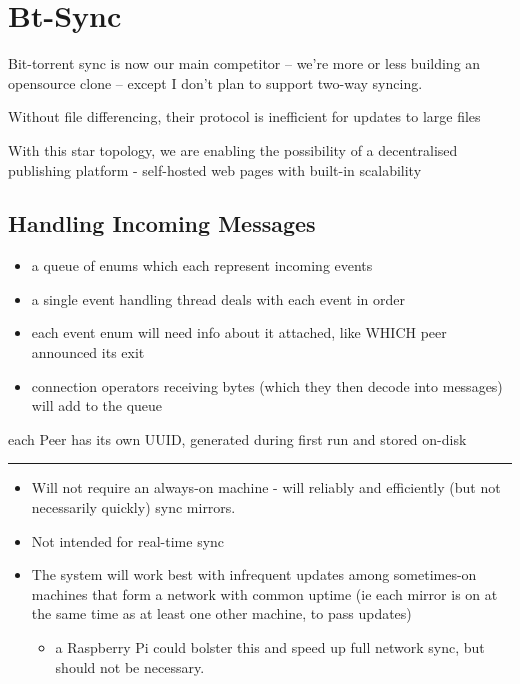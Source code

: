 \documentclass[12pt,a4paper,]{book}
\begin{document}
\section{Bt-Sync}\label{bt-sync}

Bit-torrent sync is now our main competitor -- we're more or less
building an opensource clone -- except I don't plan to support two-way
syncing.

Without file differencing, their protocol is inefficient for updates to
large files

With this star topology, we are enabling the possibility of a
decentralised publishing platform - self-hosted web pages with built-in
scalability

\subsection{Handling Incoming
Messages}\label{handling-incoming-messages}

\begin{itemize}
\itemsep1pt\parskip0pt
\item
  a queue of enums which each represent incoming events
\item
  a single event handling thread deals with each event in order
\item
  each event enum will need info about it attached, like WHICH peer
  announced its exit
\item
  connection operators receiving bytes (which they then decode into
  messages) will add to the queue
\end{itemize}

each Peer has its own UUID, generated during first run and stored
on-disk

\begin{center}\rule{3in}{0.4pt}\end{center}

\begin{itemize}
\itemsep1pt\parskip0pt
\item
  Will not require an always-on machine - will reliably and efficiently
  (but not necessarily quickly) sync mirrors.
\item
  Not intended for real-time sync
\item
  The system will work best with infrequent updates among sometimes-on
  machines that form a network with common uptime (ie each mirror is on
  at the same time as at least one other machine, to pass updates)

  \begin{itemize}
  \itemsep1pt\parskip0pt
  \item
    a Raspberry Pi could bolster this and speed up full network sync,
    but should not be necessary.
  \end{itemize}
\end{itemize}
\end{document}
